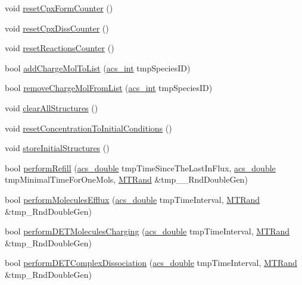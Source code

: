 \begin{DoxyCompactItemize}
void \hyperlink{classenvironment_a4cf4413f3028f8c5e33991ad5ba18e21}{reset\-Cpx\-Form\-Counter} ()
\item 
void \hyperlink{classenvironment_a987dc7b9f211f34564343ee0eaa20dc1}{reset\-Cpx\-Diss\-Counter} ()
\item 
void \hyperlink{classenvironment_a5c8713237992b28c39199a7aea3f9ea0}{reset\-Reactions\-Counter} ()
\item 
bool \hyperlink{classenvironment_a7981c34d16c0b1e9e6ca3ea69aa3a8a3}{add\-Charge\-Mol\-To\-List} (\hyperlink{acs__headers_8h_a8d277355641a098190360234e2ebde35}{acs\-\_\-int} tmp\-Species\-I\-D)
\item 
bool \hyperlink{classenvironment_aa4830018af0b99eddefcdefad877b305}{remove\-Charge\-Mol\-From\-List} (\hyperlink{acs__headers_8h_a8d277355641a098190360234e2ebde35}{acs\-\_\-int} tmp\-Species\-I\-D)
\item 
void \hyperlink{classenvironment_aa860227725dbe5b0251a25f440773161}{clear\-All\-Structures} ()
\item 
void \hyperlink{classenvironment_a97305e36924f19e72bfc1c3d89e45931}{reset\-Concentration\-To\-Initial\-Conditions} ()
\item 
void \hyperlink{classenvironment_a7fc3937fb586db93c33f7f091dc99626}{store\-Initial\-Structures} ()
\item 
bool \hyperlink{classenvironment_a8a53821ad1675b0da50591616aac3b74}{perform\-Refill} (\hyperlink{acs__headers_8h_ab776853a005fcbf56af0424a2a4dd607}{acs\-\_\-double} tmp\-Time\-Since\-The\-Last\-In\-Flux, \hyperlink{acs__headers_8h_ab776853a005fcbf56af0424a2a4dd607}{acs\-\_\-double} tmp\-Minimal\-Time\-For\-One\-Mols, \hyperlink{class_m_t_rand}{M\-T\-Rand} \&tmp\-\_\-\-\_\-\-Rnd\-Double\-Gen)
\item 
bool \hyperlink{classenvironment_acbbcdb4c77231e9ffa4c169e0caa0d0c}{perform\-Molecules\-Efflux} (\hyperlink{acs__headers_8h_ab776853a005fcbf56af0424a2a4dd607}{acs\-\_\-double} tmp\-Time\-Interval, \hyperlink{class_m_t_rand}{M\-T\-Rand} \&tmp\-\_\-\-Rnd\-Double\-Gen)
\item 
bool \hyperlink{classenvironment_adbaf165a12edd62c614a455544807ea3}{perform\-D\-E\-T\-Molecules\-Charging} (\hyperlink{acs__headers_8h_ab776853a005fcbf56af0424a2a4dd607}{acs\-\_\-double} tmp\-Time\-Interval, \hyperlink{class_m_t_rand}{M\-T\-Rand} \&tmp\-\_\-\-Rnd\-Double\-Gen)
\item 
bool \hyperlink{classenvironment_a6ae793f9d2dca0632239be955dd83cee}{perform\-D\-E\-T\-Complex\-Dissociation} (\hyperlink{acs__headers_8h_ab776853a005fcbf56af0424a2a4dd607}{acs\-\_\-double} tmp\-Time\-Interval, \hyperlink{class_m_t_rand}{M\-T\-Rand} \&tmp\-\_\-\-Rnd\-Double\-Gen)

\end{DoxyCompactItemize}
